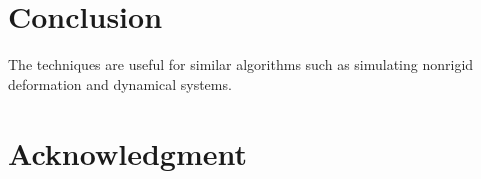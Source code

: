 \documentclass[10pt,conference]{IEEEtran}
\begin{document}
%






\section{Conclusion}
The techniques are
useful for similar algorithms such as simulating nonrigid deformation and
dynamical systems.






\section*{Acknowledgment}
\end{document}
